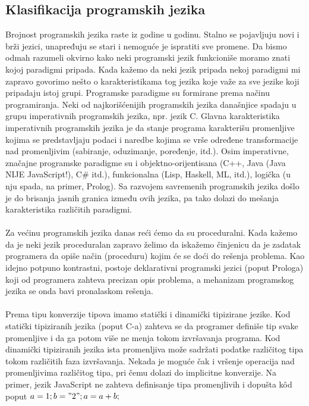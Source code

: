 \documentclass[a4paper]{article}
\begin{document}
\subsection{Klasifikacija programskih jezika}
Brojnost programskih jezika raste iz godine u godinu. Stalno se pojavljuju novi i brži jezici, unapređuju se stari i nemoguće je ispratiti sve promene. Da bismo odmah razumeli okvirno kako neki programski jezik funkcioniše moramo znati kojoj paradigmi pripada. Kada kažemo da neki jezik pripada nekoj paradigmi mi zapravo govorimo nešto o karakteristikama tog jezika koje važe za sve jezike koji pripadaju istoj grupi. Programske paradigme su formirane prema načinu programiranja. Neki od najkorišćenijih programskih jezika današnjice spadaju u grupu imperativnih programskih jezika, npr. jezik C. Glavna karakteristika imperativnih programskih jezika je da stanje programa karakterišu promenljive kojima se predstavljaju podaci i naredbe kojima se vrše određene transformacije nad promenljivim (sabiranje, oduzimanje, poređenje, itd.). Osim imperativne, značajne programske paradigme su i
objektno-orijentisana (C++, Java (Java NIJE JavaScript!), C\# itd.), funkcionalna (Lisp, Haskell, ML, itd.), logička (u nju spada, na primer, Prolog). Sa razvojem savremenih programskih jezika došlo je do brisanja jasnih granica između ovih jezika, pa tako dolazi do mešanja karakteristika različitih paradigmi.\\\\
Za većinu programskih jezika danas reći ćemo da su proceduralni. Kada kažemo da je neki jezik proceduralan zapravo želimo da iskažemo činjenicu da je zadatak programera da opiše način (proceduru) kojim će se doći do rešenja problema. Kao idejno potpuno kontrastni, postoje deklarativni programski jezici (poput Prologa) koji od programera zahteva precizan opis problema, a mehanizam programskog jezika se onda bavi pronalaskom rešenja.\\\\
Prema tipu konverzije tipova imamo statički i dinamički tipizirane jezike. Kod statički tipiziranih jezika (poput C-a) zahteva se da programer definiše tip svake promenljive i da ga potom više ne menja tokom izvršavanja programa. Kod dinamički tipiziranih jezika ista promenljiva može sadržati podatke različitog tipa tokom različitih faza izvršavanja. Nekada je moguće čak i vršenje operacija nad promenljivima različitog tipa, pri čemu dolazi do implicitne konverzije. Na primer, jezik JavaScript ne zahteva definisanje tipa promenjlivih i dopušta kôd poput $a = 1; b = "2"; a = a + b;$\\\\
\end{document}

